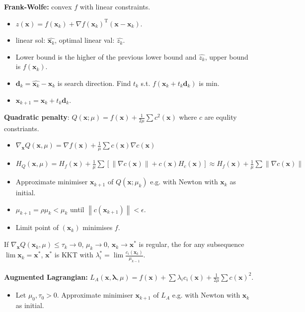 \documentclass[12pt]{article}
\newcommand{\norm}[1]{\left\lVert#1\right\rVert}
\begin{document}
\begin{multicols*}{3}
        \textbf{Frank-Wolfe: } convex $f$ with linear constraints.
        \begin{itemize}
            \item $z(\bm{x}) = f(\bm{x}_k) + \nabla f(\bm{x}_k)^{\mathrm{T}}(\bm{x} - \bm{x}_k)$.
            \item linear sol: $\hat{\bm{x}_k}$, optimal linear val: $\hat{z_k}$.
            \item Lower bound is the higher of the previous lower bound and $\hat{z_k}$, upper bound is $f(\bm{x}_k)$.
            \item $\bm{d}_k = \hat{\bm{x}_k} - \bm{x}_k$ is search direction. Find $t_k$ s.t. $f(\bm{x}_k + t_k\bm{d}_k)$ is min.
            \item $\bm{x}_{k + 1} = \bm{x}_k + t_k\bm{d}_k$.
        \end{itemize}
        \textbf{Quadratic penalty}: $Q(\bm{x}; \mu) = f(\bm{x}) + \frac{1}{2\mu}\sum c^2(\bm{x})$ where $c$ are equlity constriants.
        \begin{itemize}
            \item $\nabla_{\bm{x}} Q(\bm{x}, \mu) = \nabla f(\bm{x}) + \frac{1}{\mu}\sum c(\bm{x})\nabla c(\bm{x})$
            \item $H_Q(\bm{x}, \mu) = H_f(\bm{x}) + \frac{1}{\mu}\sum \left[\norm{\nabla c(\bm{x})} + c(\bm{x})H_c(\bm{x})\right] \approx H_f(\bm{x}) + \frac{1}{\mu}\sum \norm{\nabla c(\bm{x})}$
            \item Approximate minimiser $\bm{x}_{k + 1}$ of $Q(\bm{x}; \mu_k)$ e.g. with Newton with $\bm{x}_k$ as initial.
            \item $\mu_{k + 1} = \rho\mu_k < \mu_k$ until $\norm{c(\bm{x}_{k + 1})} < \epsilon$.
            \item Limit point of $(\bm{x}_k)$ minimises $f$.
        \end{itemize}
        If $\nabla_{\bm{x}} Q(\bm{x}_k, \mu) \leq \tau_k \to 0$, $\mu_k \to 0$, $\bm{x}_k \to \bm{x}^*$ is regular, the for any subsequence $\lim \bm{x}_k = \bm{x}^*$, $\bm{x}^*$ is KKT with $\lambda^*_i = \lim\frac{c_i(\bm{x}_k)}{\mu_{k - 1}}$.
        \\\\
        \textbf{Augmented Lagrangian:} $L_A(\bm{x}, \bm{\lambda}, \mu) = f(\bm{x}) + \sum \lambda_i c_i(\bm{x}) + \frac{1}{2\mu}\sum c(\bm{x})^2$.
        \begin{itemize}
            \item Let $\mu_0, \tau_0 > 0$. Approximate minimiser $\bm{x}_{k + 1}$ of $L_A$ e.g. with Newton with $\bm{x}_k$ as initial.

\end{itemize}
\end{multicols*}
\end{document}
